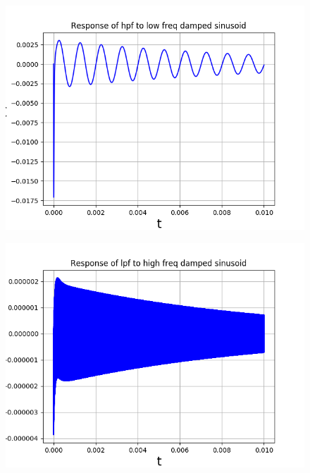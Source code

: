 \documentclass[11pt, a4paper]{article}
\begin{document}
\begin{figure}[!tbh]
   	\centering
   	\includegraphics[scale=0.5]{img8.png}
   	\label{fig:32}
   \end{figure}
\begin{figure}[!tbh]
   	\centering
   	\includegraphics[scale=0.5]{img9.png}
   	\label{fig:32}
   \end{figure}
\end{document}

